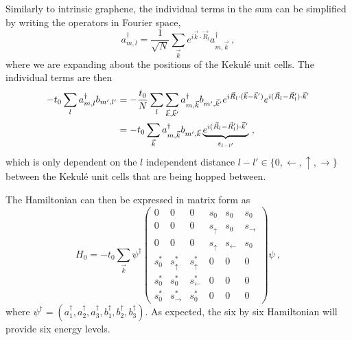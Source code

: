 Similarly to intrinsic graphene, the individual terms in the sum can be simplified by writing the operators in Fourier space,
\begin{equation}
	a_{m,l}^{\dagger}=\frac{1}{\sqrt{N}}\sum_{\vec{k}} e^{ i \vec{k}  \cdot \vec{R}_l} a_{m,\vec{k} }^{\dagger} \ ,
	\label{eq:kek:FT}
\end{equation}
where we are expanding about the positions of the Kekul\'e unit cells.
The individual terms are then
\begin{align*}
	-t_0 \sum_l a^{\dagger}_{m,l} b_{m',l'} &=
	    -\frac{t_0}{N}\sum_l \sum_{\vec{k},\vec{k}'} a^{\dagger}_{m,\vec{k}} b_{m',\vec{k}'} 
	    e^{i \vec{R}_l \cdot (\vec{k}-\vec{k}')} e^{i(\vec{R}_l-\vec{R}_l')\cdot \vec{k}'} \\
	    &= -t_0 \sum_{\vec{k}} a^{\dagger}_{m,\vec{k}} b_{m',\vec{k}} \underbrace{e^{i(\vec{R}_l-\vec{R}_l')\cdot \vec{k}'}}_{s_{l-l'}} \ ,
\end{align*}
which is only dependent on the $l$ independent distance $l-l' \in \{ 0,\leftarrow,\uparrow,\rightarrow \}$ between the Kekul\'e unit cells that are being hopped between.

The Hamiltonian can then be expressed in matrix form as
\begin{equation}
	H_0=-t_0 \sum_{\vec{k}} \psi^{\dagger} 
	\left(\begin{array}{cccccc}
		0     & 0                 & 0                & s_0          & s_0            & s_0 \\
		0     & 0                 & 0                & s_{\uparrow} & s_0            & s_{\rightarrow} \\
		0     & 0                 & 0                & s_{\uparrow} & s_{\leftarrow} & s_0 \\
		s_0^* & s_{\uparrow}^*    & s_{\uparrow}^*   & 0            & 0              & 0 \\
		s_0^* & s_0^*             & s_{\leftarrow}^* & 0            & 0              & 0 \\
		s_0^* & s_{\rightarrow}^* & s_0^*            & 0            & 0              & 0 
	\end{array}\right)
	\psi \ ,
	\label{eq:kek:Hzonefold}
\end{equation}
where $\psi^{\dagger}=\left( a^{\dagger}_1, a^{\dagger}_2, a^{\dagger}_3, b^{\dagger}_1, b^{\dagger}_2, b^{\dagger}_3 \right)$.
As expected, the six by six Hamiltonian will provide six energy levels.

